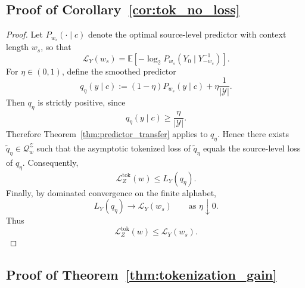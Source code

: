 \documentclass{article}
\theoremstyle{plain}
\theoremstyle{definition}
\theoremstyle{remark}
\begin{document}
    
    
        
    \subsection{Proof of Corollary~\ref{cor:tok_no_loss}}
    \label{proof:tok_no_loss}
    
    \begin{proof}
    Let $P_{w_s}(\cdot\mid c)$ denote the optimal source-level predictor with
    context length $w_s$, so that
    \[
        \mathcal L_Y(w_s)
        =
        \mathbb E\left[
            -\log_2 P_{w_s}(Y_0\mid Y_{-w_s}^{-1})
        \right].
    \]
    For $\eta\in(0,1)$, define the smoothed predictor
    \[
        q_\eta(y\mid c)
        :=
        (1-\eta)P_{w_s}(y\mid c)
        +
        \eta\frac{1}{|\mathcal Y|}.
    \]
    Then $q_\eta$ is strictly positive, since
    \[
        q_\eta(y\mid c)\ge \frac{\eta}{|\mathcal Y|}.
    \]
    Therefore Theorem~\ref{thm:predictor_transfer} applies to $q_\eta$. Hence there
    exists $\tilde q_\eta\in\mathcal Q_w^{\mathcal Z}$ such that the asymptotic
    tokenized loss of $\tilde q_\eta$ equals the source-level loss of $q_\eta$.
    Consequently,
    \[
        \mathcal L_Z^{\mathrm{tok}}(w)
        \le
        L_Y(q_\eta).
    \]
    Finally, by dominated convergence on the finite alphabet,
    \[
        L_Y(q_\eta)\to \mathcal L_Y(w_s)
        \qquad
        \text{as }\eta\downarrow 0.
    \]
    Thus
    \[
        \mathcal L_Z^{\mathrm{tok}}(w)
        \le
        \mathcal L_Y(w_s).
    \]
    \end{proof}
    
    \subsection{Proof of Theorem~\ref{thm:tokenization_gain}}
    \label{proof:tokenization_gain}
    
\end{document}
